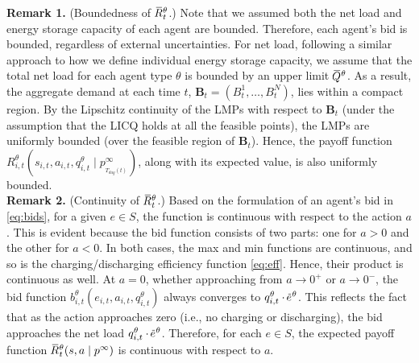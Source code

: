 \documentclass{article}
\theoremstyle{definition}
\newtheorem{assumption}{Assumption}
\theoremstyle{plain}
\newcommand{\overbar}[1]{\mkern1.5mu\overline{\mkern-3.0mu#1\mkern-1mu}\mkern 1.5mu}
\begin{document}
\noindent\textbf{Remark 1.} (Boundedness of $\overbar{R}^{\theta}_t$.)
Note that we assumed both the net load and energy storage capacity of each agent are bounded. Therefore, each agent's bid is bounded, regardless of external uncertainties. For net load, following a similar approach to how we define individual energy storage capacity, we assume that the total net load for each agent type $\theta$ is bounded by an upper limit $\overbar{Q}^{\theta}$. As a result, the aggregate demand at each time $t$, $\mathbf{B}_t = (B^1_t, \ldots, B^N_t)$, lies within a compact region. By the Lipschitz continuity of the LMPs with respect to $\mathbf{B}_t$ (under the assumption that the LICQ holds at all the feasible points), the LMPs are uniformly bounded (over the feasible region of $\mathbf{B}_t$). Hence, the payoff function $R^{\theta}_{i,t}(s_{i,t}, a_{i,t}, q^{\theta}_{i,t} \mid p^{\infty}_{_{T_{day}(t)}})$, along with its expected value, is also uniformly bounded. \\[-10pt]

\noindent\textbf{Remark 2.} (Continuity of $\overbar{R}^{\theta}_t$.) Based on the formulation of an agent's bid in \eqref{eq:bids}, for a given $e \in S$, the function is continuous with respect to the action $a$. This is evident because the bid function consists of two parts: one for $a > 0$ and the other for $a < 0$. In both cases, the max and min functions are continuous, and so is the charging/discharging efficiency function \eqref{eq:eff}. Hence, their product is continuous as well. At $a = 0$, whether approaching from $a \to 0^+$ or $a \to 0^-$, the bid function $b^{\theta}_{i,t}(e_{i,t}, a_{i,t}, q^{\theta}_{i,t})$ always converges to $q_{i,t}^{\theta} \cdot \overbar{e}^{\theta}$. This reflects the fact that as the action approaches zero (i.e., no charging or discharging), the bid approaches the net load $q_{i,t}^{\theta} \cdot \overbar{e}^{\theta}$. Therefore, for each $e \in S$, the expected payoff function $\overbar{R}^{\theta}_t(s, a \mid p^{\infty})$ is continuous with respect to $a$.

\end{document}
